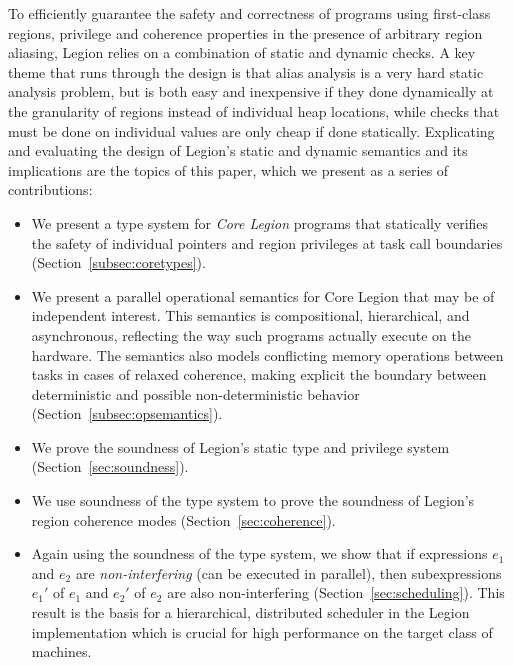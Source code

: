 To efficiently guarantee the safety and
correctness of programs using first-class regions,
privilege and coherence properties in the presence of arbitrary region
aliasing, Legion relies on a combination of static and
dynamic checks.  A key theme that runs through the design is that 
alias analysis is a very hard static analysis problem, but is both easy and
inexpensive if they done dynamically at the granularity of regions instead of individual
heap locations, while checks that must be done on individual values are only
cheap if done statically.  Explicating and evaluating the design of Legion's
static and dynamic semantics and its implications are the topics of this paper,
which we present as a series of contributions:
\begin{itemize}
\item We present a type system for {\em Core Legion} programs that statically
  verifies the safety of individual pointers and region
  privileges at task call boundaries (Section~\ref{subsec:coretypes}).

\item We present a parallel operational semantics for Core Legion that
  may be of independent interest.  This semantics is compositional,
  hierarchical, and asynchronous, reflecting the way such programs
  actually execute on the hardware.  The semantics also
  models conflicting memory operations between tasks in cases of relaxed
  coherence, making explicit the boundary between deterministic and
  possible non-deterministic behavior (Section~\ref{subsec:opsemantics}).

\item We prove the soundness of Legion's static type and privilege system (Section~\ref{sec:soundness}).


\item We use soundness of the type system to prove the soundness of
  Legion's region coherence modes (Section~\ref{sec:coherence}).


\item Again using the soundness of the type system,  we show that if expressions $e_1$ and $e_2$ are {\em non-interfering} (can be executed in parallel), then subexpressions
$e_1'$ of $e_1$ and $e_2'$ of $e_2$ are also non-interfering (Section~\ref{sec:scheduling}).  
This result is the basis
for a hierarchical, distributed scheduler in the Legion implementation which is crucial for high performance
on the target class of machines.


\end{itemize}
